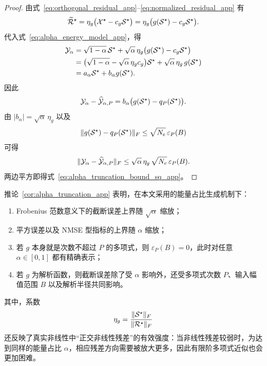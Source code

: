 \begin{proof}
由式~\eqref{eq:orthogonal_residual_app}--\eqref{eq:normalized_residual_app} 有
\begin{equation}
\widetilde{\mathcal{R}}^\star
=
\eta_g\bigl(\mathcal{X}^\star-c_g\mathcal{S}^\star\bigr)
=
\eta_g\bigl(g(\mathcal{S}^\star)-c_g\mathcal{S}^\star\bigr).
\end{equation}
代入式~\eqref{eq:alpha_energy_model_app}，得
\begin{align}
\mathcal{Y}_\alpha
&=
\sqrt{1-\alpha}\,\mathcal{S}^\star
+
\sqrt{\alpha}\,\eta_g\bigl(g(\mathcal{S}^\star)-c_g\mathcal{S}^\star\bigr) \\
&=
\bigl(\sqrt{1-\alpha}-\sqrt{\alpha}\,\eta_g c_g\bigr)\mathcal{S}^\star
+
\sqrt{\alpha}\,\eta_g\,g(\mathcal{S}^\star) \\
&=
a_\alpha \mathcal{S}^\star + b_\alpha g(\mathcal{S}^\star).
\end{align}
因此
\begin{equation}
\mathcal{Y}_\alpha-\widehat{\mathcal{Y}}_{\alpha,P}
=
b_\alpha\bigl(g(\mathcal{S}^\star)-q_P(\mathcal{S}^\star)\bigr).
\end{equation}
由 $|b_\alpha|=\sqrt{\alpha}\,\eta_g$ 以及
\begin{equation}
\|g(\mathcal{S}^\star)-q_P(\mathcal{S}^\star)\|_F
\le
\sqrt{N_e}\,\varepsilon_P(B)
\end{equation}
可得
\begin{equation}
\|\mathcal{Y}_\alpha-\widehat{\mathcal{Y}}_{\alpha,P}\|_F
\le
\sqrt{\alpha}\,\eta_g\,\sqrt{N_e}\,\varepsilon_P(B).
\end{equation}
两边平方即得式~\eqref{eq:alpha_truncation_bound_sq_app}。
\end{proof}

\begin{remark}
推论~\ref{cor:alpha_truncation_app} 表明，在本文采用的能量占比生成机制下：

\begin{enumerate}
    \item Frobenius 范数意义下的截断误差上界随 $\sqrt{\alpha}$ 缩放；
    \item 平方误差以及 NMSE 型指标的上界随 $\alpha$ 缩放；
    \item 若 $g$ 本身就是次数不超过 $P$ 的多项式，则 $\varepsilon_P(B)=0$，此时对任意 $\alpha\in[0,1]$ 都有精确表示；
    \item 若 $g$ 为解析函数，则截断误差除了受 $\alpha$ 影响外，还受多项式次数 $P$、输入幅值范围 $B$ 以及解析半径共同影响。
\end{enumerate}

其中，系数
\begin{equation}
\eta_g=\frac{\|\mathcal{S}^\star\|_F}{\|\mathcal{R}^\star\|_F}
\end{equation}
还反映了真实非线性中“正交非线性残差”的有效强度：当非线性残差较弱时，为达到同样的能量占比 $\alpha$，相应残差方向需要被放大更多，因此有限阶多项式近似也会更加困难。
\end{remark}

